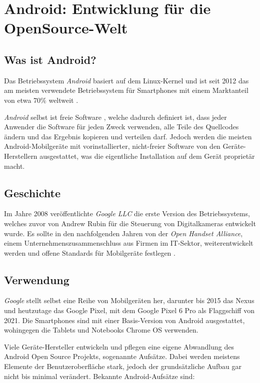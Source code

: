 \section{Android: Entwicklung für die OpenSource-Welt}
\label{androiddev}

\subsection{Was ist Android?}
Das Betriebssystem \textit{Android} basiert auf dem Linux-Kernel und ist seit 2012 das am meisten
verwendete Betriebssystem für Smartphones mit einem Marktanteil von etwa 70\% weltweit
\cite{mobileOsMarketShare}.

\textit{Android} selbst ist freie Software \cite{androidOpenSourceProject}, welche dadurch definiert
ist, dass jeder Anwender die Software für jeden Zweck verwenden, alle Teile des Quellcodes
ändern und das Ergebnis kopieren und verteilen darf. Jedoch werden die meisten Android-Mobilgeräte
mit vorinstallierter, nicht-freier Software von den Geräte-Herstellern ausgestattet, was die
eigentliche Installation auf dem Gerät proprietär macht.

\subsection{Geschichte}
Im Jahre 2008 veröffentlichte \textit{Google LLC} die erste Version des Betriebssystems, welches
zuvor von Andrew Rubin für die Steuerung von Digitalkameras entwickelt wurde. Es sollte in den
nachfolgenden Jahren von der \textit{Open Handset Alliance}, einem Unternehmenszusammenschluss
aus Firmen im IT-Sektor, weiterentwickelt werden und offene Standards für Mobilgeräte festlegen
\cite{androidHistory}.

\subsection{Verwendung}
\textit{Google} stellt selbst eine Reihe von Mobilgeräten her, darunter bis 2015 das Nexus und
heutzutage das Google Pixel, mit dem Google Pixel 6 Pro als Flaggschiff von 2021. Die Smartphones
sind mit einer Basis-Version von Android ausgestattet, wohingegen die Tablets und Notebooks Chrome
OS verwenden.

Viele Geräte-Hersteller entwickeln und pflegen eine eigene Abwandlung des Android Open Source
Projekts, sogenannte Aufsätze. Dabei werden meistens Elemente der Benutzeroberfläche stark, jedoch
der grundsätzliche Aufbau gar nicht bis minimal verändert. Bekannte Android-Aufsätze sind:

